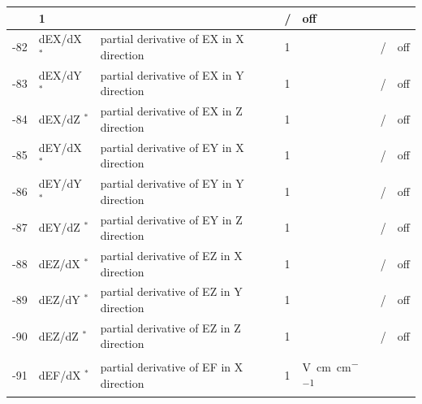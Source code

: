 \begin{landscape}
\begin{longtable}{|r|l|l|l|l|c|c|}
                           & 1                            &
			   & /              & off
    \\ \hline
    -82                    & dEX/dX $^*$
                           & partial derivative of EX in X direction
                           & 1                            &
			   & /              & off
    \\ \hline
    -83                    & dEX/dY $^*$
                           & partial derivative of EX in Y direction
                           & 1                            &
			   & /              & off
    \\ \hline
    -84                    & dEX/dZ $^*$
                           & partial derivative of EX in Z direction
                           & 1                            &
			   & /              & off
    \\ \hline
    -85                    & dEY/dX $^*$
                           & partial derivative of EY in X direction
                           & 1                            &
			   & /              & off
    \\ \hline
    -86                    & dEY/dY $^*$
                           & partial derivative of EY in Y direction
                           & 1                            &
			   & /              & off
    \\ \hline
    -87                    & dEY/dZ $^*$
                           & partial derivative of EY in Z direction
                           & 1                            &
			   & /              & off
    \\ \hline
    -88                    & dEZ/dX $^*$
                           & partial derivative of EZ in X direction
                           & 1                            &
			   & /              & off
    \\ \hline
    -89                    & dEZ/dY $^*$
                           & partial derivative of EZ in Y direction
                           & 1                            &
			   & /              & off
    \\ \hline
    -90                    & dEZ/dZ $^*$
                           & partial derivative of EZ in Z direction
                           & 1                            &
			   & /              & off
    \\ \hline
    -91                    & dEF/dX $^*$
                           & partial derivative of EF in X direction
                           & 1                            & \si{\volt\per\centi\metre\per\centi\metre}

\end{longtable}
\end{landscape}
